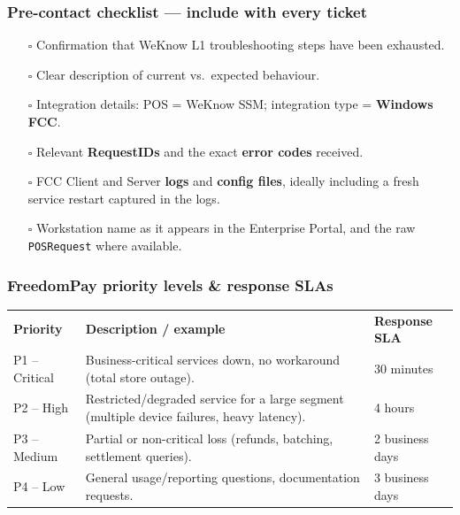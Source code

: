 \documentclass[a4paper,10pt]{article}
\begin{document}
\subsubsection*{Pre-contact checklist --- include with every ticket}

\begin{itemize}
  \item[$\square$] Confirmation that WeKnow L1 troubleshooting steps have
        been exhausted.
  \item[$\square$] Clear description of current vs.\ expected behaviour.
  \item[$\square$] Integration details: POS = WeKnow SSM; integration
        type = \textbf{Windows FCC}.
  \item[$\square$] Relevant \textbf{RequestIDs} and the exact
        \textbf{error codes} received.
  \item[$\square$] FCC Client and Server \textbf{logs} and \textbf{config
        files}, ideally including a fresh service restart captured in the
        logs.
  \item[$\square$] Workstation name as it appears in the Enterprise
        Portal, and the raw \texttt{POSRequest} where available.
\end{itemize}

\subsubsection*{FreedomPay priority levels \& response SLAs}

\begin{center}
\renewcommand{\arraystretch}{1.3}\small
\begin{tabularx}{\textwidth}{L{24mm} X L{28mm}}
\color{white}\textbf{Priority} &
\color{white}\textbf{Description / example} &
\color{white}\textbf{Response SLA}\\
P1 -- Critical & Business-critical services down, no workaround
(total store outage). & 30 minutes\\
P2 -- High & Restricted/degraded service for a large segment
(multiple device failures, heavy latency). & 4 hours\\
P3 -- Medium & Partial or non-critical loss (refunds, batching,
settlement queries). & 2 business days\\
P4 -- Low & General usage/reporting questions, documentation
requests. & 3 business days\\
\end{tabularx}
\end{center}
\end{document}
